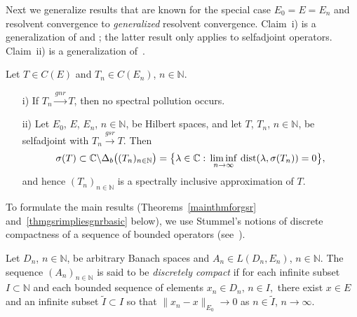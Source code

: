 \documentclass[a4paper,reqno]{amsart}
\begin{document}
{Next we generalize results that are known for the special case $E_0=E=E_n$  and resolvent convergence to \emph{generalized} resolvent convergence.
Claim~i) is a generalization of \cite[Theorem~IV.2.25]{kato} and  \cite[Satz~9.26~b)]{weid1}; the latter result only applies to selfadjoint operators.
Claim~ii) is a generalization of~\cite[Satz 9.24 a)]{weid1}.

\begin{theorem}\label{thmgeneralizedresconv}
Let $T\in C(E)$ and $T_n\in C(E_n)$, $n\in{\mathbb{N}}$.
\begin{enumerate}
\item[\rm i)]
If $T_n{\stackrel{gnr}{\rightarrow}} T$, then no spectral pollution occurs.

\item[\rm ii)]
Let $E_0$, $E$, $E_n$, $n\in{\mathbb{N}}$, be Hilbert spaces, and let $T$, $T_n$, $n\in{\mathbb{N}}$, be selfadjoint with $T_n{\stackrel{gsr}{\rightarrow}} T$.
Then \begin{equation}\sigma(T)\subset{\mathbb{C}}\backslash \Delta_b\big((T_n)_{n\in{\mathbb{N}}}\big)=\big\{\lambda\in{\mathbb{C}}:\,\liminf_{n\to\infty}\,{\rm dist}(\lambda,\sigma(T_n))=0\big\},\label{eq.Deltab.selfadjoint}\end{equation}
and hence $(T_n)_{n\in{\mathbb{N}}}$ is a spectrally inclusive approximation of $T$.
\end{enumerate}
\end{theorem}

To formulate the main results (Theorems~\ref{mainthmforgsr} and~\ref{thmgsrimpliesgnrbasic} below), we use Stummel's notions of
discrete compactness of a sequence of bounded operators (see~\cite[Definition~3.1.(k)]{stummel1}).

\begin{definition}\label{defdiscreteconvofop}
Let $D_n$, $n\in{\mathbb{N}}$, be arbitrary Banach spaces and
$A_n\in L(D_n, E_n)$, $n\in{\mathbb{N}}$. 
The sequence  $(A_n)_{n\in{\mathbb{N}}}$ is said to be \emph{discretely compact} if for each infinite subset $I\subset{\mathbb{N}}$ and each bounded sequence of elements $x_n\in D_n, \,n\in I,$ there 
exist $x\in E$ and an infinite subset $\widetilde I\subset I$ so that $\|x_n-x\|_{E_0}\to 0$ as $n\in \widetilde I$, $n\to\infty$. 
\end{definition}

}
\end{document}
